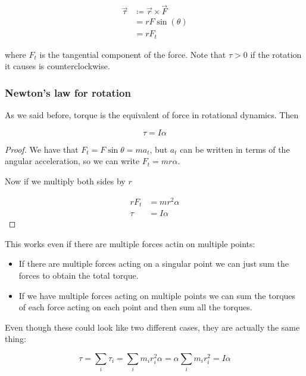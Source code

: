 \documentclass[12pt]{extarticle}
\begin{document}
\begin{align}
    \vec{\tau} & \coloneq \vec{r} \times \vec{F} \\
               & = r F \sin(\theta)              \\
               & = r F_t
\end{align}

where $F_t$ is the tangential component of the force.
Note that $\tau > 0$ if the rotation it causes is counterclockwise.

\subsubsection{Newton's law for rotation}

As we said before, torque is the equivalent of force in rotational dynamics. Then

\begin{theorem}
    \begin{equation}
        \tau = I \alpha
    \end{equation}
\end{theorem}

\begin{proof}
    We have that $F_t = F \sin \theta = m a_t$, but $a_t$ can be written in terms of the angular acceleration, so we can write $F_t = m r \alpha$.

    Now if we multiply both sides by $r$

    \begin{align}
        r F_t & = m r^2 \alpha \\
        \tau  & = I \alpha
    \end{align}
\end{proof}

This works even if there are multiple forces actin on multiple points:
\begin{itemize}
    \item If there are multiple forces acting on a singular point we can just sum the forces to obtain the total torque.
    \item If we have multiple forces acting on multiple points we can sum the torques of each force acting on each point and then sum all the torques.
\end{itemize}

Even though these could look like two different cases, they are actually the same thing:

\begin{equation}
    \tau = \sum_i \tau_i = \sum_i m_i r_i^2 \alpha = \alpha \sum_i m_i r_i^2 = I \alpha
\end{equation}
\end{document}
